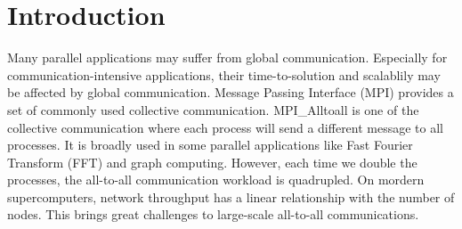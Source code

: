 \section{Introduction}




Many parallel applications may suffer from global communication.
Especially for communication-intensive applications, their time-to-solution and scalablily may be affected by global communication. 
Message Passing Interface (MPI) provides a set of commonly used collective communication.
MPI\_Alltoall is one of the collective communication where each process will send a different message to all processes.
It is broadly used in some parallel applications like Fast Fourier Transform (FFT) \cite{mehta2021parallel} and graph computing.
However, each time we double the processes, the all-to-all communication workload is quadrupled.
On mordern supercomputers, network throughput has a linear relationship with the number of nodes.
This brings great challenges to large-scale all-to-all communications.

